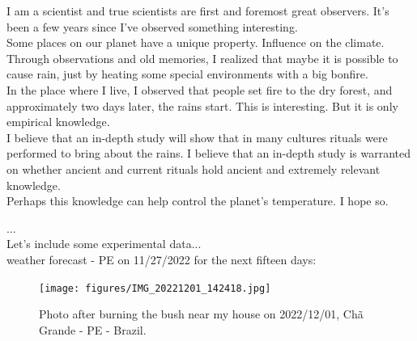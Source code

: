\documentclass{book}
\begin{document}
I am a scientist and true scientists are first and foremost great observers. It's been a few years since I've observed something interesting. \\

Some places on our planet have a unique property. Influence on the climate. Through observations and old memories, I realized that maybe it is possible to cause rain, just by heating some special environments with a big bonfire. \\

In the place where I live, I observed that people set fire to the dry forest, and approximately two days later, the rains start. This is interesting. But it is only empirical knowledge. \\

I believe that an in-depth study will show that in many cultures rituals were performed to bring about the rains. I believe that an in-depth study is warranted on whether ancient and current rituals hold ancient and extremely relevant knowledge.\\

Perhaps this knowledge can help control the planet's temperature. I hope so.

... \\

Let's include some experimental data... \\


weather forecast - PE on 11/27/2022 for the next fifteen days:



\begin{figure}[h]
	\begin{center}
	    \caption{Photo after burning the bush near my house on 2022/12/01, Chã Grande - PE - Brazil.}
		\label{fig:bushBurning}
		\centering
		\texttt{[image: figures/IMG\_20221201\_142418.jpg]}
	\end{center}
\end{figure}
\end{document}
